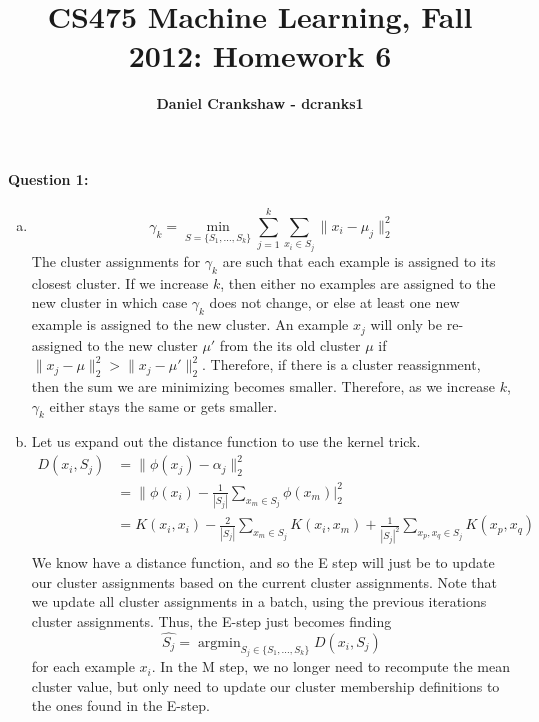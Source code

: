 \documentclass[letterpaper,11pt]{article}
\title{CS475 Machine Learning, Fall 2012: Homework 6}
\date{}
\author{\bf Daniel Crankshaw - dcranks1}
\begin{document}
\maketitle

\paragraph{Question 1:}
\begin{enumerate}[(a)]
    \item
        \begin{equation}
            \gamma_k = \min_{S=\{S_1, \ldots ,S_k\}}\sum_{j=1}^k\sum_{x_i\in S_j}\|x_i-\mu_j\|_2^2
        \end{equation}
        The cluster assignments for $\gamma_k$ are such that each example is assigned
        to its closest cluster. If we increase $k$, then either no examples are assigned
        to the new cluster in which case $\gamma_k$ does not change, or else at least
        one new example is assigned to the new cluster. An example $x_j$ will only be
        re-assigned to the new cluster $\mu'$ from the its old cluster $\mu$ if 
        $\|x_j-\mu\|_2^2 > \|x_j-\mu'\|_2^2$. Therefore, if there is a cluster
        reassignment, then the sum we are minimizing becomes smaller. Therefore, as
        we increase $k$, $\gamma_k$ either stays the same or gets smaller.
    \item
        Let us expand out the distance function to use the kernel trick.
        \begin{align}
            D(x_i, S_j) & = \|\phi(x_j)-\alpha_j\|_2^2\\
                        & = \|\phi(x_i)-\frac{1}{|S_j|}\sum_{x_m \in S_j}\phi(x_m)|_2^2\\
                        & = K(x_i, x_i) - \frac{2}{|S_j|}\sum_{x_m \in S_j} K(x_i, x_m) + \frac{1}{|S_j|^2} \sum_{x_p, x_q\in S_j} K(x_p, x_q)\\
        \end{align}
        We know have a distance function, and so the E step will just be to update our cluster assignments based
        on the current cluster assignments. Note that we update all cluster assignments in a batch, using the previous
        iterations cluster assignments.
        Thus, the E-step just becomes finding
        \begin{equation}
            \hat{S_j} = \mathop{\arg\min}_{S_j \in \{S_1,\ldots, S_k\}} D(x_i, S_j)
        \end{equation}
        for each example $x_i$. In the M step, we no longer need to recompute the mean
        cluster value, but only need to update our cluster membership definitions
        to the ones found in the E-step.
\end{enumerate}
\end{document}
